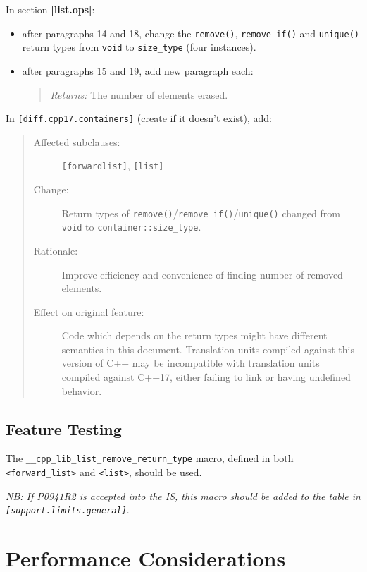 \documentclass[11pt]{article}
\begin{document}
In section \textbf{[list.ops]}:

\begin{itemize}
\item after paragraphs 14 and 18, change the \texttt{remove()},
  \texttt{remove\_if()} and \texttt{unique()} return types from
  \texttt{void} to \texttt{size\_type} (four instances).
\item after paragraphs 15 and 19, add new paragraph each:
  \begin{quotation}
    \textit{Returns:} The number of elements erased.
  \end{quotation}
\end{itemize}

In \texttt{[diff.cpp17.containers]} (create if it doesn't exist), add:

\begin{quote}
\begin{description}
\item[Affected subclauses:] \texttt{[forwardlist]},
  \texttt{[list]}
\item[Change:] Return types of
  \texttt{remove()}/\texttt{remove\_if()}/\texttt{unique()} changed
  from \texttt{void} to \texttt{container::size\_type}.
\item[Rationale:] Improve efficiency and convenience of finding number
  of removed elements.
\item[Effect on original feature:] Code which depends on the return
  types might have different semantics in this document. Translation
  units compiled against this version of C++ may be incompatible with
  translation units compiled against C++17, either failing to link or
  having undefined behavior.
\end{description}
\end{quote}

\subsection{Feature Testing}

The \texttt{\_\_cpp\_lib\_list\_remove\_return\_type} macro, defined
in both \texttt{<forward\_list>} and \texttt{<list>}, should be used.

\textit{NB: If P0941R2 is accepted into the IS, this macro should be
  added to the table in \texttt{[support.limits.general]}}.

\section{Performance Considerations}
\end{document}
